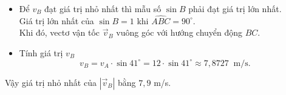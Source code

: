 \begin{ex}
{\begin{itemize}
{	}
			\item Để $v_B$ đạt giá trị nhỏ nhất thì mẫu số $\sin B$ phải đạt giá trị lớn nhất.\\
			Giá trị lớn nhất của $\sin B = 1$ khi $\widehat{ABC} = 90^\circ$.\\
			Khi đó, vectơ vận tốc $\vec{v}_B$ vuông góc với hướng chuyển động $BC$.
			\item Tính giá trị $v_B$
			\[v_B = v_A \cdot \sin 41^\circ = 12 \cdot \sin 41^\circ \approx 7{,}8727 ~\text{ m/s}.\]
		\end{itemize}
		Vậy giá trị nhỏ nhất của $|\overrightarrow{v}_B|$ bằng $7{,}9$ m/s.
	}
\end{ex}

